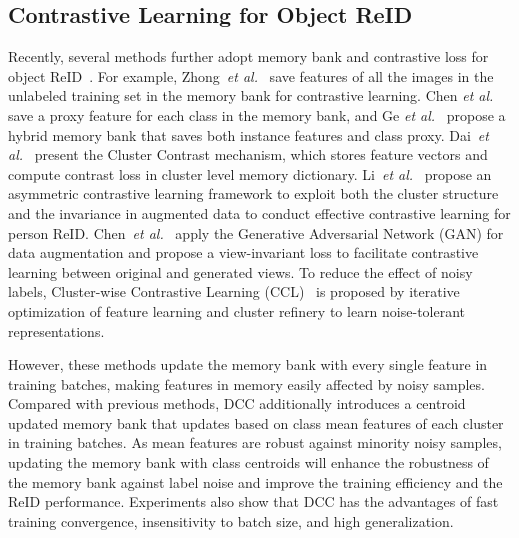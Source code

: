 \documentclass[10pt,twocolumn,letterpaper]{article}
\begin{document}
\subsection{Contrastive Learning for Object ReID}
Recently, several methods further adopt memory bank and contrastive loss for object ReID~\cite{isobe2021towards,zhong2019invariance, DBLP:conf/nips/Ge0C0L20,chen2021ice,DBLP:conf/cvpr/XiaoLWLW17,dai2021cluster,li2021cluster}. 
For example, Zhong~\emph{et al.}~\cite{zhong2019invariance} save features of all the images in the unlabeled training set in the memory bank for contrastive learning. Chen \textit{et al.}~\cite{chen2021ice} save a proxy feature for each class in the memory bank, and Ge \textit{et al.}~\cite{DBLP:conf/nips/Ge0C0L20} propose a hybrid memory bank that saves both instance features and class proxy.
Dai~\emph{et al.}~\cite{dai2021cluster} present the Cluster Contrast mechanism, which stores feature vectors and compute contrast loss in cluster level memory dictionary.
Li~\emph{et al.}~\cite{li2021cluster} propose an asymmetric contrastive learning framework to exploit both the cluster structure and the invariance in augmented data to conduct effective contrastive learning for person ReID.
Chen~\emph{et al.}~\cite{chen2021joint} apply the Generative Adversarial Network (GAN) for data augmentation and propose a view-invariant loss to facilitate contrastive learning between original and generated views. 
To reduce the effect of noisy labels, Cluster-wise Contrastive Learning (CCL)~\cite{isobe2021towards} is proposed by iterative optimization of feature learning and cluster refinery to learn noise-tolerant representations.

However, these methods update the memory bank with every single feature in training batches, making features in memory easily affected by noisy samples.
Compared with previous methods, DCC additionally introduces a centroid updated memory bank that updates based on class mean features of each cluster in training batches.
As mean features are robust against minority noisy samples, updating the memory bank with class centroids will enhance the robustness of the memory bank against label noise and improve the training efficiency and the ReID performance.
Experiments also show that DCC has the advantages of fast training convergence, insensitivity to batch size, and high generalization. 
\end{document}
